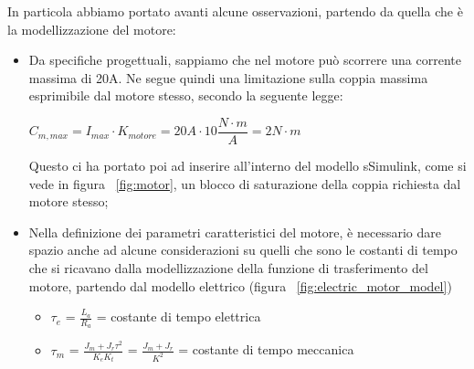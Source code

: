 In particola abbiamo portato avanti alcune osservazioni, partendo da quella che è la modellizzazione del motore:
\begin{itemize}
	\item Da specifiche progettuali, sappiamo che nel motore può scorrere una corrente massima di 20A. Ne segue quindi una limitazione sulla coppia massima esprimibile dal motore stesso, secondo la seguente legge:
	\begin{center}
		$C_{m,max} = I_{max}\cdot{K_{motore}} = 20 A\cdot{10 \dfrac{N\cdot{m}}{A}}=2N\cdot{m}$
	\end{center}
	Questo ci ha portato poi ad inserire all'interno del modello sSimulink, come si vede in figura ~\ref{fig:motor}, un blocco di saturazione della coppia richiesta dal motore stesso;
	\item Nella definizione dei parametri caratteristici del motore, è necessario dare spazio anche ad alcune considerazioni su quelli che sono le costanti di tempo che si ricavano dalla modellizzazione della funzione di trasferimento del motore, partendo dal modello elettrico (figura ~\ref{fig:electric_motor_model})
	\begin{itemize}
		\item $\tau_e$ = $\frac{L_a}{R_a}$ = costante di tempo elettrica
		\item $\tau_m$ = $\frac{J_m + J_r\tau^2}{K_e K_t}$ = $\frac{J_m + J_r}{K^2}$ = costante di tempo meccanica
	\end{itemize}


\end{itemize}

